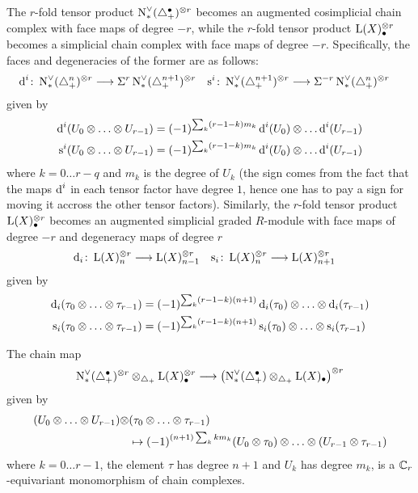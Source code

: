 The $r$-fold tensor product $\operatorname{N}^\vee_{*}(\triangle_{+}^\bullet)^{\otimes r}$ becomes an augmented cosimplicial chain complex with face maps of degree $-r$, while the $r$-fold tensor product $\operatorname{L}(X)_\bullet^{\otimes r}$ becomes a simplicial chain complex with face maps of degree $-r$. Specifically, the faces and degeneracies of the former are as follows:
\begin{align*}
	\operatorname{d}^i \colon \operatorname{N}^\vee_{*}(\triangle_{+}^n)^{\otimes r}& \longrightarrow \Sigma^{r}\operatorname{N}^\vee_{*}(\triangle_{+}^{n+1})^{\otimes r}
	&
	\operatorname{s}^i \colon \operatorname{N}^\vee_{*}(\triangle_{+}^{n+1})^{\otimes r}& \longrightarrow \Sigma^{-r}\operatorname{N}^\vee_{*}(\triangle_{+}^{n})^{\otimes r}
\end{align*}
given by
\begin{align*}
	\d^i(U_0 \ot \dots \ot U_{r-1}) &= (-1)^{\sum_k (r-1-k)m_k}\d^i(U_0) \ot \dots \d^i(U_{r-1})
	\\
	\s^i(U_0 \ot \dots \ot U_{r-1}) &= (-1)^{\sum_k (r-1-k)m_k}\d^i(U_0) \ot \dots \d^i(U_{r-1})
\end{align*}
where $k = 0\dots r-q$ and $m_k$ is the degree of $U_k$ (the sign comes from the fact that the maps $\operatorname{d}^i$ in each tensor factor have degree $1$, hence one has to pay a sign for moving it accross the other tensor factors). Similarly, the $r$-fold tensor product $\operatorname{L}(X)^{\otimes r}_{\bullet}$ becomes an augmented simplicial graded $R$-module with face maps of degree $-r$ and degeneracy maps of degree $r$
\begin{align*}
	\operatorname{d}_i \colon \operatorname{L}(X)_n^{\otimes r} & \longrightarrow \operatorname{L}(X)_{n-1}^{\otimes r}
	&
	\operatorname{s}_i \colon \operatorname{L}(X)_n^{\otimes r} & \longrightarrow \operatorname{L}(X)_{n+1}^{\otimes r}
\end{align*}
given by
\begin{align*}
	\d_i(\tau_0 \ot \dots \ot \tau_{r-1}) &= (-1)^{\sum_k (r-1-k)(n+1)} \d_i(\tau_0) \ot \dots \ot \d_i(\tau_{r-1})
	\\
	\s_i(\tau_0 \ot \dots \ot \tau_{r-1}) &= (-1)^{\sum_k (r-1-k)(n+1)} \s_i(\tau_0) \ot \dots \ot \s_i(\tau_{r-1})
	\end{align*}
\begin{lemma}\label{lemma:3}
	The chain map
	\[\operatorname{N}^\vee_{*}(\triangle_{+}^\bullet)^{\otimes r} \otimes_{\triangle_{+}} \operatorname{L}(X)_\bullet^{\otimes r} \longrightarrow \left(\operatorname{N}^\vee_{*}(\triangle_{+}^\bullet) \otimes_{\triangle_{+}} \operatorname{L}(X)_\bullet\right)^{\otimes r}\]
	given by
	\begin{align*}
		(U_0 \ot \dots \ot U_{r-1}) \ot &(\tau_0 \ot \dots \ot \tau_{r-1})
	\\
 &\mapsto (-1)^{(n+1)\sum_{k} km_k}(U_0 \ot \tau_0) \ot \dots \ot (U_{r-1} \ot \tau_{r-1})
	\end{align*}
where $k=0\dots r-1$, the element $\tau$ has degree $n+1$ and $U_k$ has degree $m_k$, is a $\mathbb{C}_r$-equivariant monomorphism of chain complexes.
\end{lemma}
